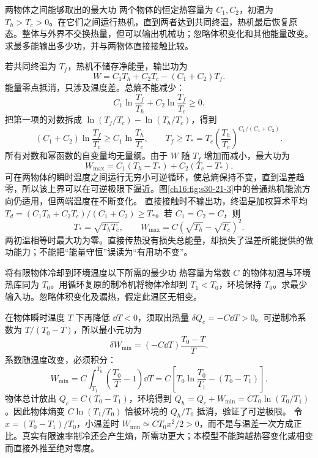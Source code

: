 \begin{origexamplebox}{两物体之间能够取出的最大功}\label{ch16:ex:teaching-finite-work}
两个物体的恒定热容量为 $C_1,C_2$，初温为 $T_h>T_c>0$。在它们之间运行热机，直到两者达到共同终温，热机最后恢复原态。整体与外界不交换热量，但可以输出机械功；忽略体积变化和其他能量改变。求最多能输出多少功，并与两物体直接接触比较。
\end{origexamplebox}
\begin{xesolution}
若共同终温为 $T_f$，热机不储存净能量，输出功为
\[
 W=C_1T_h+C_2T_c-(C_1+C_2)T_f.
\]
能量零点抵消，只涉及温度差。总熵不能减少：
\[
 C_1\ln\frac{T_f}{T_h}+C_2\ln\frac{T_f}{T_c}\ge0.
\]
把第一项的对数拆成 $\ln(T_f/T_c)-\ln(T_h/T_c)$，得到
\[
 (C_1+C_2)\ln\frac{T_f}{T_c}\ge C_1\ln\frac{T_h}{T_c},\qquad
 T_f\ge T_*=T_c\left(\frac{T_h}{T_c}\right)^{C_1/(C_1+C_2)}.
\]
所有对数和幂函数的自变量均无量纲。由于 $W$ 随 $T_f$ 增加而减小，最大功为
\[
 W_{\max}=C_1(T_h-T_*)+C_2(T_c-T_*).
\]
可在两物体的瞬时温度之间运行无穷小可逆循环，使总熵保持不变，直到温差趋零，所以该上界可以在可逆极限下逼近。图\ref{ch16:fig:s30-21-3}中的普通热机能流方向仍适用，但两端温度在不断变化。
直接接触时不输出功，终温是加权算术平均 $T_d=(C_1T_h+C_2T_c)/(C_1+C_2)\ge T_*$。若 $C_1=C_2=C$，则
\[
 T_*=\sqrt{T_hT_c},\qquad W_{\max}=C(\sqrt{T_h}-\sqrt{T_c})^2.
\]
两初温相等时最大功为零。直接传热没有损失总能量，却损失了温差所能提供的做功能力；不能把“能量守恒”误读为“有用功不变”。
\end{xesolution}

\begin{origexamplebox}{将有限物体冷却到环境温度以下所需的最少功}\label{ch16:ex:teaching-cooling-work}
热容量为常数 $C$ 的物体初温与环境热库同为 $T_0$。用循环复原的制冷机将物体冷却到 $T_1<T_0$，环境保持 $T_0$。求最少输入功。忽略体积变化及漏热，假定此温区无相变。
\end{origexamplebox}
\begin{xesolution}
在物体瞬时温度 $T$ 下再降低 $\dd T<0$，须取出热量 $\delta Q_c=-C\dd T>0$。可逆制冷系数为 $T/(T_0-T)$，所以最小元功为
\[
 \delta W_{\min}=(-C\dd T)\frac{T_0-T}{T}.
\]
系数随温度改变，必须积分：
\[
 W_{\min}=C\int_{T_1}^{T_0}\left(\frac{T_0}{T}-1\right)\dd T
 =C\left[T_0\ln\frac{T_0}{T_1}-(T_0-T_1)\right].
\]
物体总计放出 $Q_c=C(T_0-T_1)$，环境得到 $Q_h=Q_c+W_{\min}=CT_0\ln(T_0/T_1)$。因此物体熵变 $C\ln(T_1/T_0)$ 恰被环境的 $Q_h/T_0$ 抵消，验证了可逆极限。
令 $x=(T_0-T_1)/T_0$，小温差时 $W_{\min}\simeq CT_0x^2/2>0$，而不是与温差一次方成正比。真实有限速率制冷还会产生熵，所需功更大；本模型不能跨越热容变化或相变而直接外推至绝对零度。
\end{xesolution}

